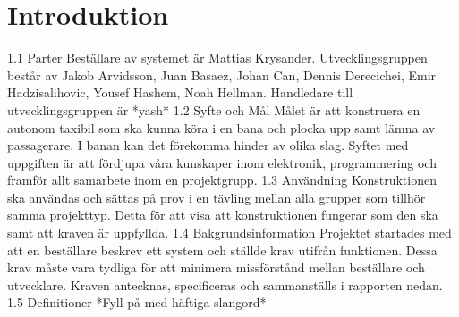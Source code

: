 \documentclass[krav.tex]{subfiles}
\begin{document}
\section{Introduktion}

1.1	Parter
Beställare av systemet är Mattias Krysander.
Utvecklingsgruppen består av Jakob Arvidsson, Juan Basaez, Johan Can, Dennis Derecichei, Emir Hadzisalihovic, Yousef Hashem, Noah Hellman.
Handledare till utvecklingsgruppen är *yash*
1.2	Syfte och Mål
Målet är att konstruera en autonom taxibil som ska kunna köra i en bana och plocka upp samt lämna av passagerare. I banan kan det förekomma hinder av olika slag. Syftet med uppgiften är att fördjupa våra kunskaper inom elektronik, programmering och framför allt samarbete inom en projektgrupp.
1.3	Användning
Konstruktionen ska användas och sättas på prov i en tävling mellan alla grupper som tillhör samma projekttyp. Detta för att visa att konstruktionen fungerar som den ska samt att kraven är uppfyllda.
1.4	Bakgrundsinformation
Projektet startades med att en beställare beskrev ett system och ställde krav utifrån funktionen. Dessa krav måste vara tydliga för att minimera missförstånd mellan beställare och utvecklare. Kraven antecknas, specificeras och sammanställs i rapporten nedan.
1.5	Definitioner
*Fyll på med häftiga slangord*
\end{document}

